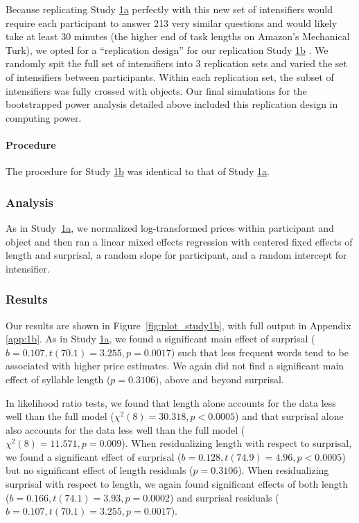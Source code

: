 Because replicating Study \hyperref[sec:study1a]{1a} perfectly with this new set of intensifiers would require each participant to answer 213 very similar questions and would likely take at least 30 minutes (the higher end of task lengths on Amazon’s Mechanical Turk), we opted for a ``replication design'' for our replication Study \hyperref[sec:study1b]{1b} \citep[following][]{judd_experiments_2017}.
We randomly spit the full set of intensifiers into 3 replication sets and varied the set of intensifiers between participants.
Within each replication set, the subset of intensifiers was fully crossed with objects.
Our final simulations for the bootstrapped power analysis detailed above included this replication design in computing power.


\paragraph{Procedure%
}

The procedure for Study \hyperref[sec:study1b]{1b} was identical to that of Study \hyperref[sec:study1a]{1a}.


\subsubsection{Analysis}

As in Study~\hyperref[sec:study1a]{1a}, we normalized log-transformed prices within participant and object and then ran a linear mixed effects regression with centered fixed effects of length and surprisal, a random slope for participant, and a random intercept for intensifier.

\subsubsection{Results}

Our results are shown in Figure~\ref{fig:plot_study1b}, with full output in Appendix \ref{app:1b}. 
As in Study \hyperref[sec:study1a]{1a}, we found a significant main effect of surprisal ($b=0.107,t(70.1)=3.255,p=0.0017$) such that less frequent words tend to be associated with higher price estimates.
We again did not find a significant main effect of syllable length ($p=0.3106$), above and beyond surprisal.

In likelihood ratio tests, we found that length alone accounts for the data less well than the full model ($\chi^2(8)=30.318,p<0.0005$) and that surprisal alone also accounts for the data less well than the full model ($\chi^2(8)=11.571,p=0.009$).
When residualizing length with respect to surprisal, we found a significant effect of surprisal ($b=0.128,t(74.9)=4.96,p<0.0005$) but no significant effect of length residuals ($p=0.3106$).
When residualizing surprisal with respect to length, we again found significant effects of both length ($b=0.166,t(74.1)=3.93,p=0.0002$) and surprisal residuals ($b=0.107,t(70.1)=3.255,p=0.0017$).

